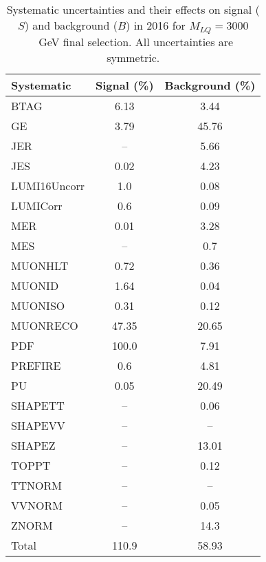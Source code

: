 \begin{table}[htbp]
\begin{center}
\caption{Systematic uncertainties and their effects on signal ($S$) and background ($B$) in 2016 for $M_{LQ}=3000$~GeV final selection. All uncertainties are symmetric.}
\begin{tabular}{lcc}
\hline\hline
Systematic & Signal (\%) & Background (\%) \\ \hline 
BTAG & 6.13 & 3.44\\ 
GE & 3.79 & 45.76\\ 
JER & -- & 5.66\\ 
JES & 0.02 & 4.23\\ 
LUMI16Uncorr & 1.0 & 0.08\\ 
LUMICorr & 0.6 & 0.09\\ 
MER & 0.01 & 3.28\\ 
MES & -- & 0.7\\ 
MUONHLT & 0.72 & 0.36\\ 
MUONID & 1.64 & 0.04\\ 
MUONISO & 0.31 & 0.12\\ 
MUONRECO & 47.35 & 20.65\\ 
PDF & 100.0 & 7.91\\ 
PREFIRE & 0.6 & 4.81\\ 
PU & 0.05 & 20.49\\ 
SHAPETT & -- & 0.06\\ 
SHAPEVV & -- & --\\ 
SHAPEZ & -- & 13.01\\ 
TOPPT & -- & 0.12\\ 
TTNORM & -- & --\\ 
VVNORM & -- & 0.05\\ 
ZNORM & -- & 14.3\\ 
Total & 110.9 & 58.93\\ \hline \hline
\end{tabular}
\label{tab:SysUncertainties_uujj_3000}
\end{center}
\end{table}

